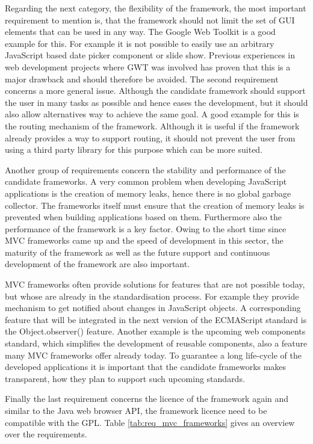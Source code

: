 Regarding the next category, the flexibility of the framework, the most important requirement to mention is, that the framework should not limit the set of GUI elements that can be used in any way.
The Google Web Toolkit \autocite{conception:gwt} is a good example for this.
For example it is not possible to easily use an arbitrary JavaScript based date picker component or slide show.
Previous experiences in web development projects where GWT was involved has proven that this is a major drawback and should therefore be avoided.
The second requirement concerns a more general issue.
Although the candidate framework should support the user in many tasks as possible and hence eases the development, but it should also allow alternatives way to achieve the same goal.
A good example for this is the routing mechanism of the framework.
Although it is useful if the framework already provides a way to support routing, it should not prevent the user from using a third party library for this purpose which can be more suited.

Another group of requirements concern the stability and performance of the candidate frameworks.
A very common problem when developing JavaScript applications is the creation of memory leaks, hence there is no global garbage collector.
The frameworks itself must ensure that the creation of memory leaks is prevented when building applications based on them.
Furthermore also the performance of the framework is a key factor.
Owing to the short time since MVC frameworks came up and the speed of development in this sector, the maturity of the framework as well as the future support and continuous development of the framework are also important.

MVC frameworks often provide solutions for features that are not possible today, but whose  are already in the standardisation process.
For example they provide mechanism to get notified about changes in JavaScript objects.
A corresponding feature that will be integrated in the next version of the ECMAScript standard is the Object.observer() feature. 
Another example is the upcoming web components standard, which simplifies the development of reusable components, also a feature many MVC frameworks offer already today.
To guarantee a long life-cycle of the developed applications it is important that the candidate frameworks makes  transparent, how they plan to support such upcoming standards.
 
Finally the last requirement concerns the licence of the framework  again and similar to the Java web browser API, the framework licence need  to be compatible with the GPL.
Table \ref{tab:req_mvc_frameworks} gives an overview over the requirements.\\

